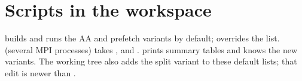 \section{Scripts in the workspace}\label{r03:sec:wl-scripts}

 builds and runs the AA and prefetch variants by default;
 overrides the list.  (several MPI processes)
takes ,  and . 
prints summary tables and knows the new variants. The working tree also adds the split variant to
these default lists; that edit is newer than \rcommitws.
